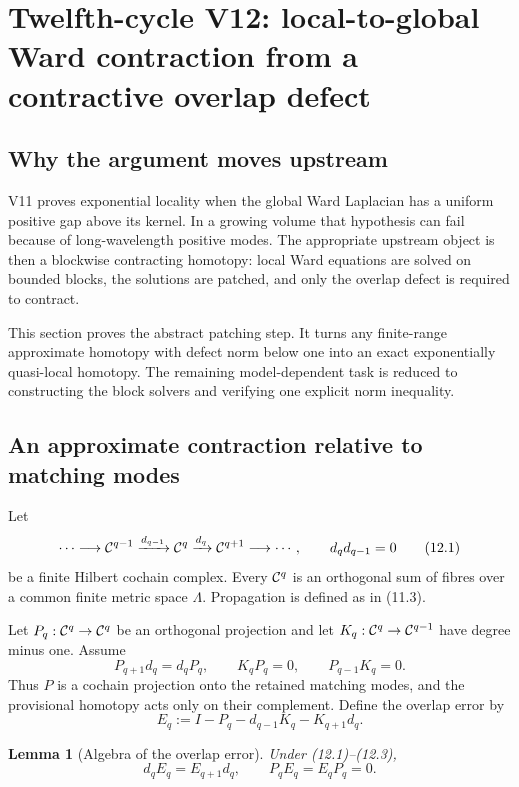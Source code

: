 \documentclass[11pt]{article}
\newtheorem{lemma}[theorem]{Lemma}
\theoremstyle{remark}
\begin{document}
\section{Twelfth-cycle V12: local-to-global Ward contraction from a
contractive overlap defect}
\label{sec:v12v12}

\subsection{Why the argument moves upstream}

V11 proves exponential locality when the global Ward Laplacian has a
uniform positive gap above its kernel.  In a growing volume that
hypothesis can fail because of long-wavelength positive modes.  The
appropriate upstream object is then a blockwise contracting homotopy:
local Ward equations are solved on bounded blocks, the solutions are
patched, and only the overlap defect is required to contract.

This section proves the abstract patching step.  It turns any
finite-range approximate homotopy with defect norm below one into an
exact exponentially quasi-local homotopy.  The remaining
model-dependent task is reduced to constructing the block solvers
and verifying one explicit norm inequality.

\subsection{An approximate contraction relative to matching modes}

Let
\[
 \cdots\longrightarrow{\cal C}^{q-1}
 \xrightarrow{d_{q-1}}{\cal C}^{q}
 \xrightarrow{d_q}{\cal C}^{q+1}
 \longrightarrow\cdots,\qquad d_qd_{q-1}=0                 \tag{12.1}
\]
be a finite Hilbert cochain complex.  Every \({\cal C}^q\) is an
orthogonal sum of fibres over a common finite metric space
\(\Lambda\).  Propagation is defined as in (11.3).

Let \(P_q:{\cal C}^q\to{\cal C}^q\) be an orthogonal projection and
let \(K_q:{\cal C}^q\to{\cal C}^{q-1}\) have degree minus one.
Assume
\[
 P_{q+1}d_q=d_qP_q,\qquad
 K_qP_q=0,\qquad P_{q-1}K_q=0.                              \tag{12.2}
\]
Thus \(P\) is a cochain projection onto the retained matching modes,
and the provisional homotopy acts only on their complement.  Define
the overlap error by
\[
 E_q:=I-P_q-d_{q-1}K_q-K_{q+1}d_q.                         \tag{12.3}
\]

\begin{lemma}[Algebra of the overlap error]
\label{lem:v12v12-error}
Under (12.1)--(12.3),
\[
 d_qE_q=E_{q+1}d_q,\qquad
 P_qE_q=E_qP_q=0.                                          \tag{12.4}
\]
\end{lemma}
\end{document}
